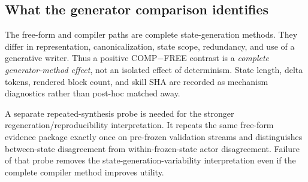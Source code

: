 \subsection{What the generator comparison identifies}
The free-form and compiler paths are complete state-generation methods. They differ in representation, canonicalization, state scope, redundancy, and use of a generative writer. Thus a positive COMP$-$FREE contrast is a \emph{complete generator-method effect}, not an isolated effect of determinism. State length, delta tokens, rendered block count, and skill SHA are recorded as mechanism diagnostics rather than post-hoc matched away.

A separate repeated-synthesis probe is needed for the stronger regeneration/reproducibility interpretation. It repeats the same free-form evidence package exactly once on pre-frozen validation streams and distinguishes between-state disagreement from within-frozen-state actor disagreement. Failure of that probe removes the state-generation-variability interpretation even if the complete compiler method improves utility.
